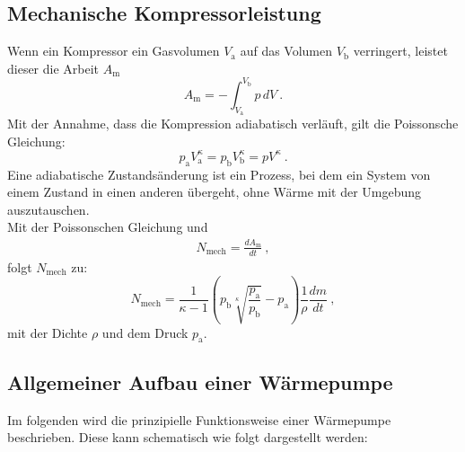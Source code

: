 \subsection{Mechanische Kompressorleistung}
Wenn ein Kompressor ein Gasvolumen $V_\text{a}$ auf das Volumen $V_\text{b}$ verringert, leistet dieser die Arbeit $A_\text{m}$
\begin{equation}
	A_\text{m} = - \int_{V_\text{a}}^{V_\text{b}} p \, dV \ .
\end{equation}
Mit der Annahme, dass die Kompression adiabatisch verläuft, gilt die Poissonsche Gleichung:
\begin{equation}
	p_\text{a} V_\text{a}^\kappa = p_\text{b} V_\text{b}^\kappa = p V^\kappa \ .
\end{equation}
Eine adiabatische Zustandsänderung ist ein Prozess, bei dem ein System von einem Zustand in einen anderen übergeht, ohne Wärme mit der Umgebung auszutauschen. \\
Mit der Poissonschen Gleichung und
\begin{align*}
	N_\text{mech} = \frac{dA_\text{m}}{dt} \ ,
\end{align*}
folgt $N_\text{mech}$ zu:
\begin{equation}
	N_\text{mech} = \frac{1}{\kappa - 1} \left(p_\text{b} \sqrt[\kappa]{\frac{p_\text{a}}{p_\text{b}}} - p_\text{a} \right) \frac{1}{\rho} \frac{dm}{dt} \ ,
	\label{eqn:nmech}
\end{equation}
mit der Dichte $\rho$ und dem Druck $p_\text{a}$.

\subsection{Allgemeiner Aufbau einer Wärmepumpe}
Im folgenden wird die prinzipielle Funktionsweise einer Wärmepumpe beschrieben. Diese kann schematisch wie folgt dargestellt werden:


